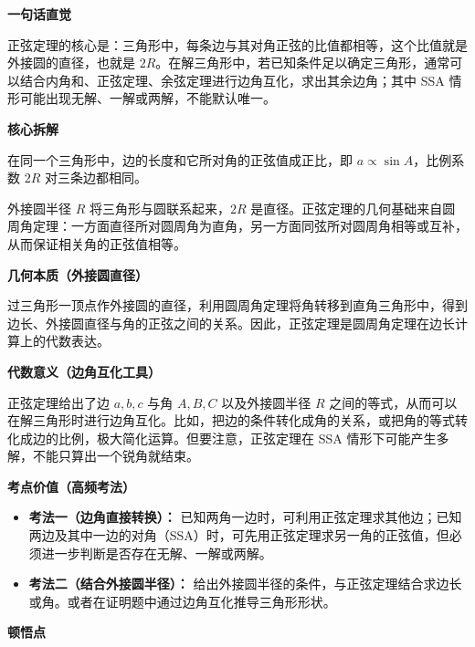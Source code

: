 \begin{explanationbox}
	\textbf{\textcolor{CExplanation}{一句话直觉}}

	正弦定理的核心是：三角形中，每条边与其对角正弦的比值都相等，这个比值就是外接圆的直径，也就是 $2R$。在解三角形中，若已知条件足以确定三角形，通常可以结合内角和、正弦定理、余弦定理进行边角互化，求出其余边角；其中 SSA 情形可能出现无解、一解或两解，不能默认唯一。

	\medskip
	\textbf{\textcolor{CExplanation}{核心拆解}}
	\begin{description}[style=nextline, leftmargin=2.8em, labelsep=0.5em, itemsep=0.45em]
		\item[\textbf{要点一（边角比例关系）：}] 在同一个三角形中，边的长度和它所对角的正弦值成正比，即 $a \propto \sin A$，比例系数 $2R$ 对三条边都相同。
		\item[\textbf{要点二（外接圆桥梁）：}] 外接圆半径 $R$ 将三角形与圆联系起来，$2R$ 是直径。正弦定理的几何基础来自圆周角定理：一方面直径所对圆周角为直角，另一方面同弦所对圆周角相等或互补，从而保证相关角的正弦值相等。
	\end{description}

	\medskip
	\textbf{\textcolor{CExplanation}{几何本质（外接圆直径）}}

	过三角形一顶点作外接圆的直径，利用圆周角定理将角转移到直角三角形中，得到边长、外接圆直径与角的正弦之间的关系。因此，正弦定理是圆周角定理在边长计算上的代数表达。

	\medskip
	\textbf{\textcolor{CExplanation}{代数意义（边角互化工具）}}

	正弦定理给出了边 $a,b,c$ 与角 $A,B,C$ 以及外接圆半径 $R$ 之间的等式，从而可以在解三角形时进行边角互化。比如，把边的条件转化成角的关系，或把角的等式转化成边的比例，极大简化运算。但要注意，正弦定理在 SSA 情形下可能产生多解，不能只算出一个锐角就结束。

	\medskip
	\textbf{\textcolor{CExplanation}{考点价值（高频考法）}}
	\begin{itemize}[leftmargin=*, itemsep=0.5em, topsep=0.4em]
		\item \textbf{考法一（边角直接转换）：} 已知两角一边时，可利用正弦定理求其他边；已知两边及其中一边的对角（SSA）时，可先用正弦定理求另一角的正弦值，但必须进一步判断是否存在无解、一解或两解。
		\item \textbf{考法二（结合外接圆半径）：} 给出外接圆半径的条件，与正弦定理结合求边长或角。或者在证明题中通过边角互化推导三角形形状。
	\end{itemize}

	\medskip
	\textbf{\textcolor{CExplanation}{顿悟点}}


\end{explanationbox}
